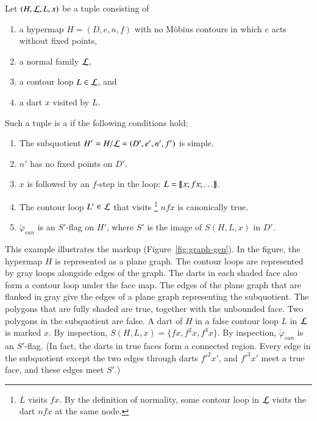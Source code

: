 \begin{definition}\label{def:marked}
Let $(H,{\cal L},L,x)$ be a tuple consisting of 
\begin{enumerate}
\item a hypermap $H=(D,e,n,f)$ with no M\"obius contours  in which
  $e$ acts without fixed points,  %
\item a normal family ${\cal L}$, 
\item a contour loop $L\in{\cal L}$, and
\item a dart $x$ visited by $L$.
\end{enumerate}
Such a tuple is a  if
the following conditions hold:
\begin{enumerate}
\item The subquotient $H'=H/{\cal L} = (D',e',n',f')$ is simple.  
\item $n'$ has no fixed points on $D'$.
\item $x$ is followed by an $f$-step in the loop: $L = {\llbracket{x;fx;\ldots}\rrbracket}$.
\item The contour loop $L'\in {\cal L}$ that visits%
\footnote{$L$ visits  $f x$.  By the definition of normality, some contour loop in
${\cal L}$ visits the dart $n f x$ at the same node.} 
$n f x$ is canonically true.
\item 
  $\check\varphi_{can}$ is an $S'$-flag on $H'$, where $S'$ is the image of 
  $S(H,L,x)$ in $D'$.  %
\end{enumerate}
\end{definition}


\begin{example}[illustration]\label{ex:graph-gen}  
  This example illustrates the markup (Figure~\ref{fig:graph-gen}).
  In the figure, the hypermap $H$ is represented as a plane graph.
  The contour loops are represented by gray loops alongside edges
  of the  graph.  The darts in each shaded face also form a contour loop
  under the face map.  The edges of the plane graph that are flanked in gray
  give the edges of a plane
  graph representing the subquotient.  The polygons that are fully shaded
  are true, together with the unbounded face.
  Two polygons in the subquotient are false.  A dart of $H$ in
  a false contour loop $L$ in ${\cal L}$ is marked $x$.  By inspection,
  $S(H,L,x)=\{f x,f^2 x,f^3 x\}$.  By inspection,
  $\check\varphi_{can}$ is an $S'$-flag.  (In fact, the darts in true
  faces form a connected region.  Every edge in the subquotient except
  the two edges through darts $f'^{2} x'$, and $f'^{3} x'$ meet
  a true face, and these edges meet $S'$.)
\end{example}

